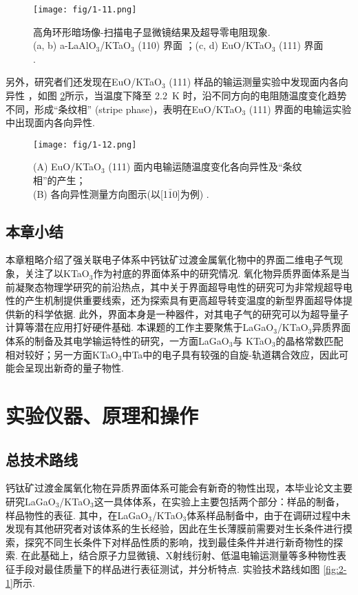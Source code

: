 \documentclass[12pt,a4paper,openany,twoside,UTF-8]{book}
\begin{document}
\begin{figure}[htbp]
\centering
\texttt{[image: fig/1-11.png]}
\caption{高角环形暗场像-扫描电子显微镜结果及超导零电阻现象. \\(a, b) a-LaAlO$_3$/KTaO$_3$ (110) 界面 \cite{ref21}；(c, d) EuO/KTaO$_3$ (111) 界面 \cite{ref22}.}
\label{fig:1-11} 
\end{figure}

另外，研究者们还发现在EuO/KTaO$_3$ (111) 样品的输运测量实验中发现面内各向异性 \cite{ref22}，如图 \ref{fig:1-12}所示，当温度下降至 \SI{2.2}{K} 时，沿不同方向的电阻随温度变化趋势不同，形成“条纹相” (stripe phase)，表明在EuO/KTaO$_3$ (111) 界面的电输运实验中出现面内各向异性.

\begin{figure}[htbp]
\centering
\texttt{[image: fig/1-12.png]}
\caption{(A) EuO/KTaO$_3$ (111) 面内电输运随温度变化各向异性及“条纹相”的产生；\\(B) 各向异性测量方向图示(以[1$\bar{1}$0]为例) \cite{ref22}.}
\label{fig:1-12} 
\end{figure}

\section{本章小结}
本章粗略介绍了强关联电子体系中钙钛矿过渡金属氧化物中的界面二维电子气现象，关注了以KTaO$_3$作为衬底的界面体系中的研究情况. 氧化物异质界面体系是当前凝聚态物理学研究的前沿热点，其中关于界面超导电性的研究可为非常规超导电性的产生机制提供重要线索，还为探索具有更高超导转变温度的新型界面超导体提供新的科学依据. 此外，界面本身是一种器件，对其电子气的研究可以为超导量子计算等潜在应用打好硬件基础. 本课题的工作主要聚焦于LaGaO$_3$/KTaO$_3$异质界面体系的制备及其电学输运特性的研究，一方面LaGaO$_3$与 KTaO$_3$的晶格常数匹配相对较好；另一方面KTaO$_3$中Ta中的电子具有较强的自旋-轨道耦合效应，因此可能会呈现出新奇的量子物性. 


\chapter{实验仪器、原理和操作}
\section{总技术路线}
钙钛矿过渡金属氧化物在异质界面体系可能会有新奇的物性出现，本毕业论文主要研究LaGaO$_3$/KTaO$_3$这一具体体系，在实验上主要包括两个部分：样品的制备，样品物性的表征. 其中，在LaGaO$_3$/KTaO$_3$体系样品制备中，由于在调研过程中未发现有其他研究者对该体系的生长经验，因此在生长薄膜前需要对生长条件进行摸索，探究不同生长条件下对样品性质的影响，找到最佳条件并进行新奇物性的探索. 在此基础上，结合原子力显微镜、X射线衍射、低温电输运测量等多种物性表征手段对最佳质量下的样品进行表征测试，并分析特点. 实验技术路线如图 \ref{fig:2-1}所示.
\end{document}
